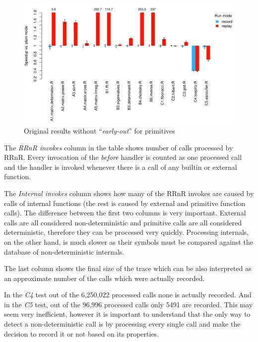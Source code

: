 \documentclass[thesis=M,english,hidelinks]{FITthesis}[2012/10/20]
\newcommand*{\qt}[1]{\enquote{{\itshape#1}}}
\begin{document}
		\begin{figure}[ht]\centering
			\includegraphics[width=1.0\textwidth]{benchmarks/R-benchmark_orig/plot_difference}
			\caption{Original results without \qt{early-out} for primitives}\label{fig:rbench_orig}
		\end{figure}
		\FloatBarrier
		
		The \emph{RRnR invokes} column in the table shows number of calls processed by RRnR. Every invocation of the \emph{before} handler is counted as one processed call and the handler is invoked whenever there is a call of any builtin or external function.\par
		
		The \emph{Internal invokes} column shows how many of the RRnR invokes are caused by calls of internal functions (the rest is caused by external and primitive function calls). The difference between the first two columns is very important. External calls are all considered non-deterministic and primitive calls are all considered deterministic, therefore they can be processed very quickly. Processing internals, on the other hand, is much slower as their symbols must be compared against the database of non-deterministic internals.\par
		
		The last column shows the final size of the trace which can be also interpreted as an approximate number of the calls which were actually recorded.\par
		
		In the \emph{C4} test out of the 6,250,022 processed calls none is actually recorded. And in the \emph{C5} test, out of the 96,996 processed calls only 5491 are recorded. This may seem very inefficient, however it is important to understand that the only way to detect a non-deterministic call is by processing every single call and make the decision to record it or not based on its properties.\par
		
\end{document}

